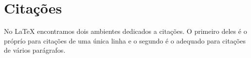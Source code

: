 \section{Citações}
No LaTeX encontramos dois ambientes dedicados a citações. O primeiro deles é o  próprío para citações de uma única linha e o segundo é o  adequado para citações de vários parágrafos.
